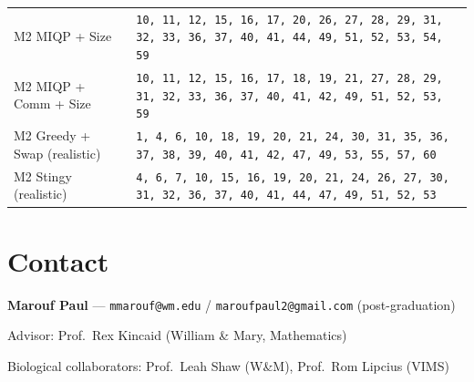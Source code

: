 \documentclass[11pt]{article}
\begin{document}
\begin{longtable}{@{}l p{12cm}@{}}
M2 MIQP + Size & \texttt{10, 11, 12, 15, 16, 17, 20, 26, 27, 28, 29, 31, 32, 33, 36, 37, 40, 41, 44, 49, 51, 52, 53, 54, 59} \\
M2 MIQP + Comm + Size & \texttt{10, 11, 12, 15, 16, 17, 18, 19, 21, 27, 28, 29, 31, 32, 33, 36, 37, 40, 41, 42, 49, 51, 52, 53, 59} \\
M2 Greedy + Swap (realistic) & \texttt{1, 4, 6, 10, 18, 19, 20, 21, 24, 30, 31, 35, 36, 37, 38, 39, 40, 41, 42, 47, 49, 53, 55, 57, 60} \\
M2 Stingy (realistic) & \texttt{4, 6, 7, 10, 15, 16, 19, 20, 21, 24, 26, 27, 30, 31, 32, 36, 37, 40, 41, 44, 47, 49, 51, 52, 53} \\
\bottomrule
\end{longtable}

\section*{Contact}

\noindent\textbf{Marouf Paul} --- \texttt{mmarouf@wm.edu} / \texttt{maroufpaul2@gmail.com} (post-graduation)

\noindent Advisor: Prof.\ Rex Kincaid (William \& Mary, Mathematics)

\noindent Biological collaborators: Prof.\ Leah Shaw (W\&M), Prof.\ Rom Lipcius (VIMS)
\end{document}
